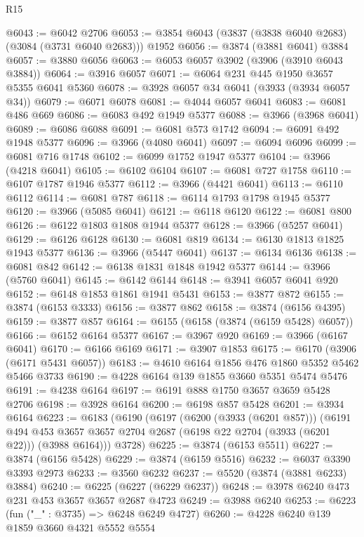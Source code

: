 \begin{lexlean}{R15}
\begin{coremodule}
@6043 := @6042 @2706
@6053 := @3854 @6043 (@3837 (@3838 @6040 @2683) (@3084 (@3731 @6040 @2683))) @1952
@6056 := @3874 (@3881 @6041) @3884
@6057 := @3880 @6056
@6063 := @6053 @6057 @3902 (@3906 (@3910 @6043 @3884))
@6064 := @3916 @6057
@6071 := @6064 @231 @445 @1950 @3657 @5355 @6041 @5360
@6078 := @3928 @6057 @34 @6041 (@3933 (@3934 @6057 @34))
@6079 := @6071 @6078
@6081 := @4044 @6057 @6041
@6083 := @6081 @486 @669
@6086 := @6083 @492 @1949 @5377
@6088 := @3966 (@3968 @6041)
@6089 := @6086 @6088
@6091 := @6081 @573 @1742
@6094 := @6091 @492 @1948 @5377
@6096 := @3966 (@4080 @6041)
@6097 := @6094 @6096
@6099 := @6081 @716 @1748
@6102 := @6099 @1752 @1947 @5377
@6104 := @3966 (@4218 @6041)
@6105 := @6102 @6104
@6107 := @6081 @727 @1758
@6110 := @6107 @1787 @1946 @5377
@6112 := @3966 (@4421 @6041)
@6113 := @6110 @6112
@6114 := @6081 @787
@6118 := @6114 @1793 @1798 @1945 @5377
@6120 := @3966 (@5085 @6041)
@6121 := @6118 @6120
@6122 := @6081 @800
@6126 := @6122 @1803 @1808 @1944 @5377
@6128 := @3966 (@5257 @6041)
@6129 := @6126 @6128
@6130 := @6081 @819
@6134 := @6130 @1813 @1825 @1943 @5377
@6136 := @3966 (@5447 @6041)
@6137 := @6134 @6136
@6138 := @6081 @842
@6142 := @6138 @1831 @1848 @1942 @5377
@6144 := @3966 (@5760 @6041)
@6145 := @6142 @6144
@6148 := @3941 @6057 @6041 @920
@6152 := @6148 @1853 @1861 @1941 @5431
@6153 := @3877 @872
@6155 := @3874 (@6153 @3333)
@6156 := @3877 @862
@6158 := @3874 (@6156 @4395)
@6159 := @3877 @857
@6164 := @6155 (@6158 (@3874 (@6159 @5428) @6057))
@6166 := @6152 @6164 @5377
@6167 := @3967 @920
@6169 := @3966 (@6167 @6041)
@6170 := @6166 @6169
@6171 := @3907 @1853
@6175 := @6170 (@3906 (@6171 @5431 @6057))
@6183 := @4610 @6164 @1856 @476 @1860 @5352 @5462 @5466 @3733
@6190 := @4228 @6164 @139 @1855 @3660 @5351 @5474 @5476
@6191 := @4238 @6164
@6197 := @6191 @888 @1750 @3657 @3659 @5428 @2706
@6198 := @3928 @6164
@6200 := @6198 @857 @5428
@6201 := @3934 @6164
@6223 := @6183
    (@6190
      (@6197
        (@6200 (@3933 (@6201 @857)))
        (@6191
          @494
          @453
          @3657
          @3657
          @2704
          @2687
          (@6198 @22 @2704 (@3933 (@6201 @22)))
          (@3988 @6164)))
      @3728)
@6225 := @3874 (@6153 @5511)
@6227 := @3874 (@6156 @5428)
@6229 := @3874 (@6159 @5516)
@6232 := @6037 @3390 @3393 @2973
@6233 := @3560 @6232
@6237 := @5520 (@3874 (@3881 @6233) @3884)
@6240 := @6225 (@6227 (@6229 @6237))
@6248 := @3978 @6240 @473 @231 @453 @3657 @3657 @2687 @4723
@6249 := @3988 @6240
@6253 := @6223 (fun ("_" : @3735) => @6248 @6249 @4727)
@6260 := @4228 @6240 @139 @1859 @3660 @4321 @5552 @5554

\end{coremodule}
\end{lexlean}
